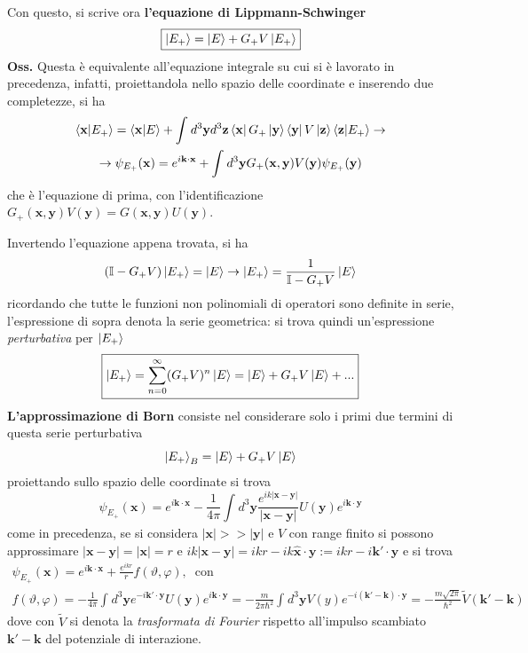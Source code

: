 Con questo, si scrive ora \textbf{l'equazione di Lippmann-Schwinger}
$$\boxed{\ket{E_+} = \ket{E}+G_+V\ket{E_+}}$$
\textbf{Oss.} Questa è equivalente all'equazione integrale su cui si è lavorato in precedenza,
infatti, proiettandola nello spazio delle coordinate e inserendo due completezze, si ha
\begin{gather*}
\bra{\mathbf{x}}\ket{E_+} = \bra{\mathbf{x}}\ket{E} + \int_{}^{}d^3\mathbf{y}d^3\mathbf{z}
\bra{\mathbf{x}}G_+\ket{\mathbf{y}}\bra{\mathbf{y}}V\ket{\mathbf{z}}\bra{\mathbf{z}}\ket{E_+}
\rightarrow\\ \rightarrow\psi_{E_+}(\mathbf{x})=e^{i\mathbf{k}\cdot\mathbf{x}}+\int_{}^{}d^3\mathbf{y}
G_+(\mathbf{x},\mathbf{y})V(\mathbf{y})\psi_{E_+}(\mathbf{y})
\end{gather*}
che è l'equazione di prima, con l'identificazione $G_+(\mathbf{x},\mathbf{y})V(\mathbf{y}) =
G(\mathbf{x},\mathbf{y})U(\mathbf{y})$.

Invertendo l'equazione appena trovata, si ha
$$(\mathbb{I}-G_+V)\ket{E_+} = \ket{E}\rightarrow\ket{E_+}= \frac{1}{\mathbb{I}-G_+V}\ket{E}$$
ricordando che tutte le funzioni non polinomiali di operatori sono definite in serie, l'espressione
di sopra denota la serie geometrica: si trova quindi un'espressione \textit{perturbativa} per
$\ket{E_+}$
$$\boxed{\ket{E_+} = \sum_{n=0}^{\infty}(G_+V)^n\ket{E} = \ket{E} + G_+V\ket{E} +...}$$
\textbf{L'approssimazione di Born} consiste nel considerare solo i primi due termini di questa serie
perturbativa
$$\ket{E_+}_B = \ket{E}+G_+V\ket{E}$$
proiettando sullo spazio delle coordinate si trova
$$\psi_{E_+}(\mathbf{x}) = e^{i\mathbf{k}\cdot\mathbf{x}} - \frac{1}{4\pi}\int_{}^{}d^3\mathbf{y}
\frac{e^{ik|\mathbf{x}-\mathbf{y}|}}{|\mathbf{x}-\mathbf{y}|}U(\mathbf{y})
e^{i\mathbf{k}\cdot\mathbf{y}}$$
come in precedenza, se si considera $|\mathbf{x}|>>|\mathbf{y}|$ e $V$ con range finito si possono
approssimare $|\mathbf{x}-\mathbf{y}| = |\mathbf{x}|=r$ e $ik|\mathbf{x}-\mathbf{y}|=
ikr - ik\mathbf{\hat x}\cdot\mathbf{y}:=ikr-i\mathbf{k'}\cdot\mathbf{y}$ e si trova
\begin{gather*}
\psi_{E_+}(\mathbf{x}) = e^{i\mathbf{k}\cdot\mathbf{x}} + \frac{e^{ikr}}{r}f(\vartheta,\varphi),
\phantom{x}\text{con}\\f(\vartheta,\varphi)
=-\frac{1}{4\pi}\int_{}^{}d^3\mathbf{y}e^{-i\mathbf{k'}\cdot\mathbf{y}}U(\mathbf{y})e^{i\mathbf{k}
\cdot\mathbf{y}} = -\frac{m}{2\pi\hbar^2}\int_{}^{}d^3\mathbf{y}V(y)e^{-i(\mathbf{k'}-\mathbf{k})\cdot
\mathbf{y}} = -\frac{m\sqrt{2\pi}}{\hbar^2} \tilde V(\mathbf{k'}-\mathbf{k})
\end{gather*}
dove con $\tilde V$ si denota la \textit{trasformata di Fourier} rispetto all'impulso scambiato
$\mathbf{k'}-\mathbf{k}$ del potenziale di interazione.

